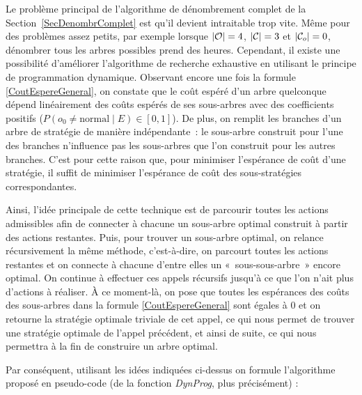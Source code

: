 \documentclass[a4paper,11pt]{article}
\theoremstyle{plain}
\theoremstyle{definition}
\DeclarePairedDelimiter{\abs}{\lvert}{\rvert}
\begin{document}
Le problème principal de l'algorithme de dénombrement complet de la Section~\ref{SecDenombrComplet} est qu'il devient intraitable trop vite. Même pour des problèmes assez petits, par exemple lorsque $\abs{\mathcal O} = 4$, $\abs{\mathcal C} = 3$ et $\abs{\mathcal C_o} = 0$, dénombrer tous les arbres possibles prend des heures. Cependant, il existe une possibilité d'améliorer l'algorithme de recherche exhaustive en utilisant le principe de programmation dynamique. Observant encore une fois la formule \eqref{CoutEspereGeneral}, on constate que le coût espéré d'un arbre quelconque dépend linéairement des coûts espérés de ses sous-arbres avec des coefficients positifs ($P(o_0 \neq \text{normal} \mid E) \in \left[0, 1\right]$). De plus, on remplit les branches d'un arbre de stratégie de manière indépendante~: le sous-arbre construit pour l'une des branches n'influence pas les sous-arbres que l'on construit pour les autres branches. C'est pour cette raison que, pour minimiser l'espérance de coût d'une stratégie, il suffit de minimiser l'espérance de coût des sous-stratégies correspondantes.

Ainsi, l'idée principale de cette technique est de parcourir toutes les actions admissibles afin de connecter à chacune un sous-arbre optimal construit à partir des actions restantes. Puis, pour trouver un sous-arbre optimal, on relance récursivement la même méthode, c'est-à-dire, on parcourt toutes les actions restantes et on connecte à chacune d'entre elles un «~sous-sous-arbre~» encore optimal. On continue à effectuer ces appels récursifs jusqu'à ce que l'on n'ait plus d'actions à réaliser. À ce moment-là, on pose que toutes les espérances des coûts des sous-arbres dans la formule \eqref{CoutEspereGeneral} sont égales à $0$ et on retourne la stratégie optimale triviale de cet appel, ce qui nous permet de trouver une stratégie optimale de l'appel précédent, et ainsi de suite, ce qui nous permettra à la fin de construire un arbre optimal.

Par conséquent, utilisant les idées indiquées ci-dessus on formule l'algorithme proposé en pseudo-code (de la fonction \emph{DynProg}, plus précisément) :
\end{document}
